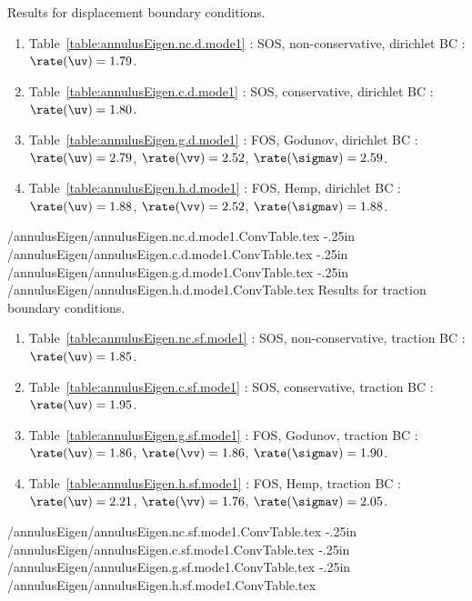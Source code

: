 \renewcommand{\tableFont}{\footnotesize}
\clearpage
Results for displacement boundary conditions.
\begin{enumerate}
  \item Table~\ref{table:annulusEigen.nc.d.mode1} : SOS, non-conservative, dirichlet BC : $\rate(\uv)=1.79$.
  \item Table~\ref{table:annulusEigen.c.d.mode1} : SOS, conservative, dirichlet BC : $\rate(\uv)=1.80$.
  \item Table~\ref{table:annulusEigen.g.d.mode1} : FOS, Godunov, dirichlet BC : $\rate(\uv)=2.79$, $\rate(\vv)=2.52$, $\rate(\sigmav)=2.59$. 
  \item Table~\ref{table:annulusEigen.h.d.mode1} : FOS, Hemp, dirichlet BC : $\rate(\uv)=1.88$, $\rate(\vv)=2.52$, $\rate(\sigmav)=1.88$. 
\end{enumerate}
 \annulusEigenDir/annulusEigen/annulusEigen.nc.d.mode1.ConvTable.tex
\vglue-.25in
 \annulusEigenDir/annulusEigen/annulusEigen.c.d.mode1.ConvTable.tex
\vglue-.25in
 \annulusEigenDir/annulusEigen/annulusEigen.g.d.mode1.ConvTable.tex
\vglue-.25in
 \annulusEigenDir/annulusEigen/annulusEigen.h.d.mode1.ConvTable.tex
% 
\clearpage
Results for traction boundary conditions.
\begin{enumerate}
  \item Table~\ref{table:annulusEigen.nc.sf.mode1} : SOS, non-conservative, traction BC : $\rate(\uv)=1.85$.
  \item Table~\ref{table:annulusEigen.c.sf.mode1} : SOS, conservative, traction BC : $\rate(\uv)=1.95$.
  \item Table~\ref{table:annulusEigen.g.sf.mode1} : FOS, Godunov, traction BC : $\rate(\uv)=1.86$, $\rate(\vv)=1.86$, $\rate(\sigmav)=1.90$. 
  \item Table~\ref{table:annulusEigen.h.sf.mode1} : FOS, Hemp, traction BC : $\rate(\uv)=2.21$, $\rate(\vv)=1.76$, $\rate(\sigmav)=2.05$. 
\end{enumerate}
 \annulusEigenDir/annulusEigen/annulusEigen.nc.sf.mode1.ConvTable.tex
\vglue-.25in
 \annulusEigenDir/annulusEigen/annulusEigen.c.sf.mode1.ConvTable.tex
\vglue-.25in
 \annulusEigenDir/annulusEigen/annulusEigen.g.sf.mode1.ConvTable.tex
\vglue-.25in
 \annulusEigenDir/annulusEigen/annulusEigen.h.sf.mode1.ConvTable.tex
